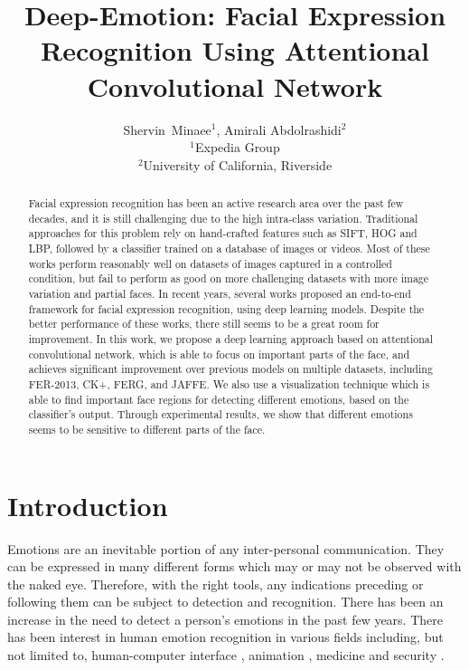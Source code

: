 \documentclass[conference]{IEEEtran}
\begin{document}
\title{Deep-Emotion: Facial Expression Recognition Using Attentional Convolutional Network}


\author{Shervin~Minaee$^{1}$, Amirali Abdolrashidi$^2$  \\ $^1$Expedia Group \\ $^2$University of California, Riverside}


\maketitle


\begin{abstract}
Facial expression recognition has been an active research area over the past few decades, and it is still challenging due to the high intra-class variation. 
   Traditional approaches for this problem rely on hand-crafted features such as SIFT, HOG and LBP, followed by a classifier trained on a database of images or videos. 
   Most of these works perform reasonably well on datasets of images captured in a controlled condition, but fail to perform as good on more challenging datasets with more image variation and partial faces. 
   In recent years, several works proposed an end-to-end framework for facial expression recognition, using deep learning models. 
   Despite the better performance of these works, there still seems to be a great room for improvement.
   In this work, we propose a deep learning approach based on attentional convolutional network, which is able to focus on important parts of the face, and achieves significant improvement over previous models on multiple datasets, including FER-2013, CK+, FERG, and JAFFE.
   We also use a visualization technique which is able to find important face regions for detecting different emotions, based on the classifier's output. 
  Through experimental results, we show that different emotions seems to be sensitive to different parts of the face.
\end{abstract}


\IEEEpeerreviewmaketitle



\section{Introduction}
Emotions are an inevitable portion of any inter-personal communication. They can be expressed in many different forms which may or may not be observed with the naked eye. 
Therefore, with the right tools, any indications preceding or following them can be subject to detection and recognition.
There has been an increase in the need to detect a person's emotions in the past few years. 
There has been interest in human emotion recognition in various fields including, but not limited to, human-computer interface \cite{hci}, animation \cite{aneja2016modeling}, medicine \cite{edwards2002emotion,chu2017facial} and security \cite{clavel2008fear,saste2017emotion}.
\end{document}
